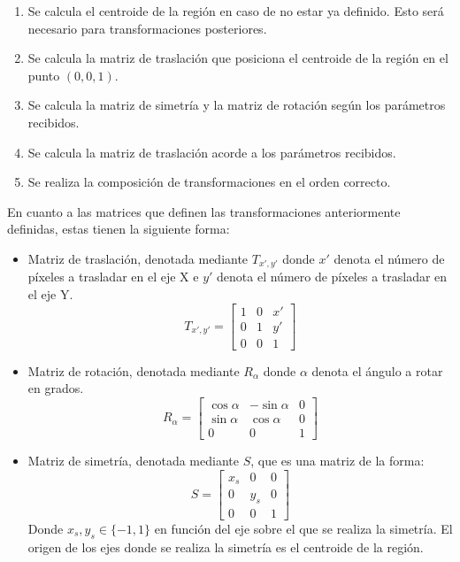 \documentclass[11pt,twoside,titlepage,a4paper]{article}
\numberwithin{equation}{section} %
\theoremstyle{usual}
\begin{document}
\begin{enumerate}
    \item Se calcula el centroide de la región en caso de no estar ya definido. Esto será necesario para transformaciones posteriores.
    \item Se calcula la matriz de traslación que posiciona el centroide de la región en el punto $(0, 0, 1)$.
    \item Se calcula la matriz de simetría y la matriz de rotación según los parámetros recibidos.
    \item Se calcula la matriz de traslación acorde a los parámetros recibidos.
    \item Se realiza la composición de transformaciones en el orden correcto.
\end{enumerate}

En cuanto a las matrices que definen las transformaciones anteriormente definidas, estas tienen la siguiente forma:

\begin{itemize}
    \item Matriz de traslación, denotada mediante $T_{x',y'}$ donde $x'$ denota el número de píxeles a trasladar en el eje X e $y'$ denota el número de píxeles a trasladar en el eje Y.
    $$T_{x',y'} = \begin{bmatrix}
    1 & 0 & x'\\
    0 & 1 & y'\\
    0 & 0 & 1
    \end{bmatrix}$$
    \item Matriz de rotación, denotada mediante $R_\alpha$ donde $\alpha$ denota el ángulo a rotar en grados.
    $$R_\alpha = \begin{bmatrix}
    \cos{\alpha} & -\sin{\alpha} & 0\\
    \sin{\alpha} & \cos{\alpha} & 0\\
    0 & 0 & 1
    \end{bmatrix}$$
    \item Matriz de simetría, denotada mediante $S$, que es una matriz de la forma:
    $$S = \begin{bmatrix}
    x_s & 0 & 0\\
    0 & y_s & 0\\
    0 & 0 & 1
    \end{bmatrix}$$
    Donde $x_s,y_s \in \{-1,1\}$ en función del eje sobre el que se realiza la simetría. El origen de los ejes donde se realiza la simetría es el centroide de  la región. 
\end{itemize}
\end{document}
